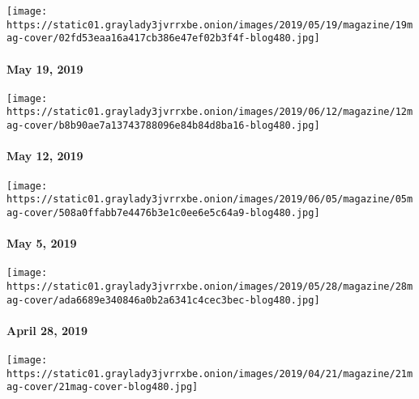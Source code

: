 \href{https://www.nytimes3xbfgragh.onion/issue/magazine/2019/05/17/the-51919-issue}{}

\texttt{[image: https://static01.graylady3jvrrxbe.onion/images/2019/05/19/magazine/19mag-cover/02fd53eaa16a417cb386e47ef02b3f4f-blog480.jpg]}

\hypertarget{may-19-2019}{%
\paragraph{May 19, 2019}\label{may-19-2019}}

\href{https://www.nytimes3xbfgragh.onion/issue/magazine/2019/05/17/the-51219-issue}{}

\texttt{[image: https://static01.graylady3jvrrxbe.onion/images/2019/06/12/magazine/12mag-cover/b8b90ae7a13743788096e84b84d8ba16-blog480.jpg]}

\hypertarget{may-12-2019}{%
\paragraph{May 12, 2019}\label{may-12-2019}}

\href{https://www.nytimes3xbfgragh.onion/issue/magazine/2019/05/17/the-5519-issue}{}

\texttt{[image: https://static01.graylady3jvrrxbe.onion/images/2019/06/05/magazine/05mag-cover/508a0ffabb7e4476b3e1c0ee6e5c64a9-blog480.jpg]}

\hypertarget{may-5-2019}{%
\paragraph{May 5, 2019}\label{may-5-2019}}

\href{https://www.nytimes3xbfgragh.onion/issue/magazine/2019/05/17/the-42819-issue}{}

\texttt{[image: https://static01.graylady3jvrrxbe.onion/images/2019/05/28/magazine/28mag-cover/ada6689e340846a0b2a6341c4cec3bec-blog480.jpg]}

\hypertarget{april-28-2019}{%
\paragraph{April 28, 2019}\label{april-28-2019}}

\href{https://www.nytimes3xbfgragh.onion/issue/magazine/2019/04/23/the-42119-issue}{}

\texttt{[image: https://static01.graylady3jvrrxbe.onion/images/2019/04/21/magazine/21mag-cover/21mag-cover-blog480.jpg]}

